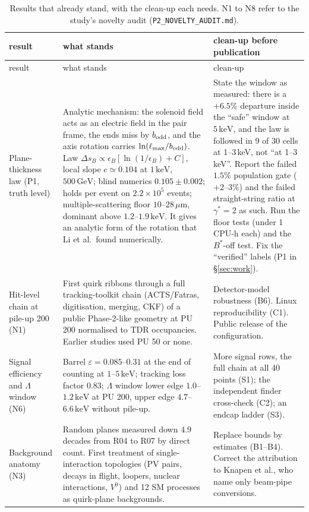 \documentclass[11pt,a4paper]{article}
\newcommand{\keV}{\,\mathrm{keV}}
\newcommand{\GeV}{\,\mathrm{GeV}}
\begin{document}
\begin{longtable}{@{}P{34mm}P{61mm}P{59mm}@{}}
\caption{Results that already stand, with the clean-up each needs. N1 to N8 refer to the study's novelty audit
(\texttt{P2\_NOVELTY\_AUDIT.md}).}\label{tab:assets}\\
\toprule
result & what stands & clean-up before publication\\
\midrule\endfirsthead
\toprule
result & what stands & clean-up\\
\midrule\endhead
Plane-thickness law (P1, truth level) &
Analytic mechanism: the solenoid field acts as an electric field in the pair frame, the ends miss by $b_{\rm odd}$, and
the axis rotation carries $\ln(\ell_{\max}/b_{\rm odd})$. Law $\Delta s_B\propto\epsilon_B[\ln(1/\epsilon_B)+C]$, local
slope $c\simeq0.104$ at $1\keV$, $500\GeV$; blind numerics $0.105\pm0.002$; holds per event on $2.2\times10^5$ events;
multiple-scattering floor $10$--$28\,\mu$m, dominant above $1.2$--$1.9\keV$. It gives an analytic form of the rotation
that Li et al.\ found numerically. &
State the window as measured: there is a $+6.5\%$ departure inside the ``safe'' window at $5\keV$, and the law is followed
in 9 of 30 cells at 1--3\,keV, not ``at 1--3\,keV''. Report the failed $1.5\%$ population gate ($+2$--$3\%$) and the
failed straight-string ratio at $\gamma^*=2$ as such. Run the floor tests (under 1 CPU-h each) and the $B^*$-off test.
Fix the ``verified'' labels (P1 in \S\ref{sec:work}).\\
Hit-level chain at pile-up 200 (N1) &
First quirk ribbons through a full tracking-toolkit chain (ACTS/Fatras, digitisation, merging, CKF) of a public
Phase-2-like geometry at PU 200 normalised to TDR occupancies. Earlier studies used PU 50 or none. &
Detector-model robustness (B6). Linux reproducibility (C1). Public release of the configuration.\\
Signal efficiency and $\Lambda$ window (N6) &
Barrel $\varepsilon=0.085$--$0.31$ at the end of counting at $1$--$5\keV$; tracking loss factor $0.83$; $\Lambda$ window
lower edge $1.0$--$1.2\keV$ at PU 200, upper edge $4.7$--$6.6\keV$ without pile-up. &
More signal rows, the full chain at all 40 points (S1); the independent finder cross-check (C2); an endcap ladder (S3).\\
Background anatomy (N3) &
Random planes measured down 4.9 decades from R04 to R07 by direct count. First treatment of single-interaction
topologies (PV pairs, decays in flight, loopers, nuclear interactions, $V^0$) and 12 SM processes as quirk-plane
backgrounds. &
Replace bounds by estimates (B1--B4). Correct the attribution to Knapen et al., who name only beam-pipe conversions.\\

\end{longtable}
\end{document}
